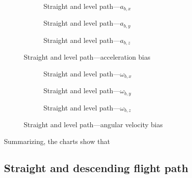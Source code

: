 \begin{figure}[H]
    \centering
    \begin{subfigure}{0.3\textwidth}
        
        \caption{Straight and level path---$a_{b,x}$}
    \end{subfigure}
    \hfill
    \begin{subfigure}{0.3\textwidth}
        
        \caption{Straight and level path---$a_{b,y}$}
    \end{subfigure}
    \hfill
    \begin{subfigure}{0.3\textwidth}
        
        \caption{Straight and level path---$a_{b,z}$}
    \end{subfigure}
    \caption{Straight and level path---acceleration bias}\label{fig:straight-level-abias}
\end{figure}

\begin{figure}[H]
    \centering
    \begin{subfigure}{0.3\textwidth}
        
        \caption{Straight and level path---$\omega_{b,x}$}
    \end{subfigure}
    \hfill
    \begin{subfigure}{0.3\textwidth}
        
        \caption{Straight and level path---$\omega_{b,y}$}
    \end{subfigure}
    \hfill
    \begin{subfigure}{0.3\textwidth}
        
        \caption{Straight and level path---$\omega_{b,z}$}
    \end{subfigure}
    \caption{Straight and level path---angular velocity bias}\label{fig:straight-level-wbias}
\end{figure}

Summarizing, the charts show that


\subsection{Straight and descending flight path}

